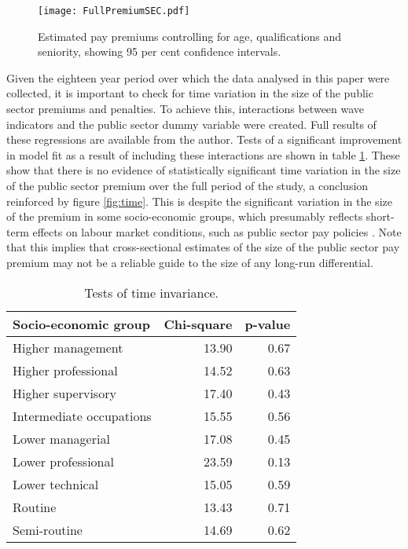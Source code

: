 \documentclass[a4paper,11pt,titlepage]{article}
\begin{document}
\begin{figure}
    \texttt{[image: FullPremiumSEC.pdf]}
    \caption{Estimated pay premiums controlling for age, qualifications and seniority,
    showing 95 per cent confidence intervals.\label{fig:full}}
\end{figure}

Given the eighteen year period over which the data analysed in this paper were collected, it is important to check for time variation in the size of the public sector premiums and penalties.  To achieve this, interactions between wave indicators and the public sector dummy variable were created.  Full results of these regressions are available from the author.  Tests of a significant improvement in model fit as a result of including these interactions are shown in table \ref{tab:time}.  These show that there is no evidence of statistically significant time variation in the size of the public sector premium over the full period of the study, a conclusion reinforced by figure \ref{fig:time}.  This is despite the significant variation in the size of the premium in some socio-economic groups, which presumably reflects short-term effects on labour market conditions, such as public sector pay policies \citep{Disney2008}.  Note that this implies that cross-sectional estimates of the size of the public sector pay premium may not be a reliable guide to the size of any long-run differential.


\begin{table}[ht]
    \caption{Tests of time invariance. \label{tab:time}}
    \begin{center}
    \begin{tabular}{lrr}
  \toprule
 Socio-economic group & Chi-square & p-value \\
  \midrule
    Higher management & 13.90 & 0.67 \\
    Higher professional & 14.52 & 0.63 \\
    Higher supervisory & 17.40 & 0.43 \\
    Intermediate occupations & 15.55 & 0.56 \\
    Lower managerial & 17.08 & 0.45 \\
    Lower professional & 23.59 & 0.13 \\
    Lower technical & 15.05 & 0.59 \\
    Routine & 13.43 & 0.71 \\
    Semi-routine & 14.69 & 0.62 \\
   \bottomrule
\end{tabular}
\end{center}
\end{table}
\end{document}
